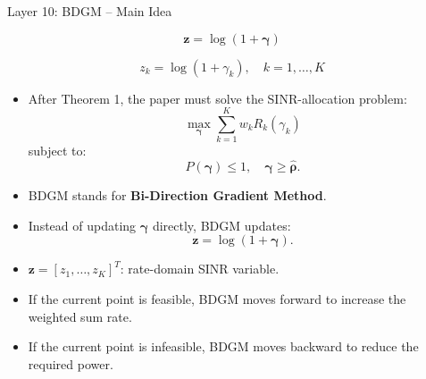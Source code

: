\documentclass{beamer}
\begin{document}
\begin{frame}{Layer 10: BDGM -- Main Idea}
\scriptsize

\[
\mathbf{z}
=
\log(1+\boldsymbol{\gamma})
\]

\[
z_k=\log(1+\gamma_k),
\quad k=1,\ldots,K
\]

\begin{itemize}
    \item After Theorem 1, the paper must solve the SINR-allocation problem:
    \[
        \max_{\boldsymbol{\gamma}}
        \sum_{k=1}^{K}w_kR_k(\gamma_k)
    \]
    subject to:
    \[
        P(\boldsymbol{\gamma})\le1,
        \quad
        \boldsymbol{\gamma}\ge\widehat{\boldsymbol{\rho}}.
    \]

    \item BDGM stands for \textbf{Bi-Direction Gradient Method}.

    \item Instead of updating \(\boldsymbol{\gamma}\) directly, BDGM updates:
    \[
        \mathbf{z}=\log(1+\boldsymbol{\gamma}).
    \]

    \item \(\mathbf{z}=[z_1,\ldots,z_K]^T\): rate-domain SINR variable.

    \item If the current point is feasible, BDGM moves forward to increase the weighted sum rate.

    \item If the current point is infeasible, BDGM moves backward to reduce the required power.
\end{itemize}

\end{frame}
\end{document}
